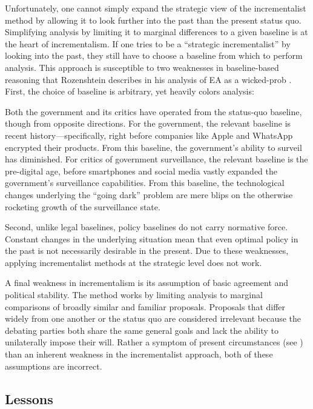 Unfortunately, one cannot simply expand the strategic view of the incrementalist method by allowing it to look further
into the past than the present status quo. Simplifying analysis by limiting it to marginal differences to a given
baseline is at the heart of \ac{incrementalism}. If one tries to be a ``strategic incrementalist'' by looking into the
past, they still have to choose a baseline from which to perform analysis. This approach is susceptible to two
weaknesses in baseline-based reasoning that Rozenshtein describes in his analysis of \ac{EA} as a \ac{wicked-prob}
\cite{rozenshtein_wicked_2018}. First, the choice of baseline is arbitrary, yet heavily colors analysis:

\begin{displayquote}
Both the government and its critics have operated from the status-quo baseline, though from opposite directions. For the
government, the relevant baseline is recent history---specifically, right before companies like Apple and WhatsApp
encrypted their products. From this baseline, the government's ability to surveil has diminished. For critics of
government surveillance, the relevant baseline is the pre-digital age, before smartphones and social media vastly
expanded the government's surveillance capabilities. From this baseline, the technological changes underlying the
``going dark'' problem are mere blips on the otherwise rocketing growth of the surveillance state.
\cite{rozenshtein_wicked_2018}
\end{displayquote}

Second, unlike legal baselines, policy baselines do not carry normative force. Constant changes in the underlying
situation mean that even optimal policy in the past is not necessarily desirable in the present. Due to these
weaknesses, applying incrementalist methods at the strategic level does not work.

A final weakness in \ac{incrementalism} is its assumption of basic agreement and political stability. The method works
by limiting analysis to marginal comparisons of broadly similar and familiar proposals. Proposals that differ widely
from one another or the status quo are considered irrelevant because the debating parties both share the same general
goals and lack the ability to unilaterally impose their will. Rather a symptom of present circumstances (see
) than an inherent weakness in the incrementalist approach, both of these assumptions are
incorrect.


\subsection{Lessons}

